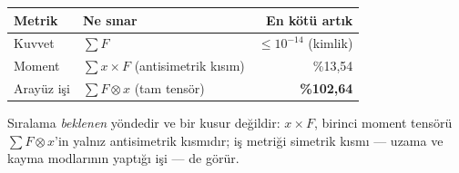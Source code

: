 \documentclass[11pt,a4paper]{article}
\begin{document}
\begin{center}\footnotesize
\begin{tabular}{@{}llr@{}}
\toprule
Metrik & Ne sınar & En kötü artık \\
\midrule
Kuvvet & $\sum F$ & $\le\!10^{-14}$ (kimlik) \\
Moment & $\sum x\times F$ (antisimetrik kısım) & \%13{,}54 \\
Arayüz işi & $\sum F\otimes x$ (tam tensör) & \textbf{\%102{,}64} \\
\bottomrule
\end{tabular}
\end{center}

\noindent Sıralama \emph{beklenen} yöndedir ve bir kusur değildir:
$x\times F$, birinci moment tensörü $\sum F\otimes x$'in yalnız
antisimetrik kısmıdır; iş metriği simetrik kısmı --- uzama ve kayma modlarının
yaptığı işi --- de görür.
\end{document}
